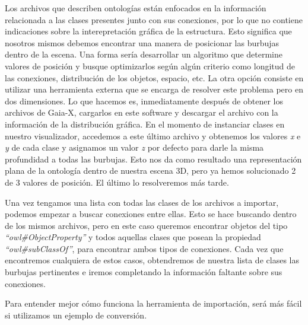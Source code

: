Los archivos que describen ontologías están enfocados en la información relacionada a las clases presentes junto con sus conexiones, por lo que no contiene indicaciones sobre la interepretación gráfica de la estructura. Esto significa que nosotros mismos debemos encontrar una manera de posicionar las burbujas dentro de la escena. Una forma sería desarrollar un algoritmo que determine valores de posición y busque optimizarlos según algún criterio como longitud de las conexiones, distribución de los objetos, espacio, etc. La otra opción consiste en utilizar una herramienta externa que se encarga de resolver este problema pero en dos dimensiones.
Lo que hacemos es, inmediatamente después de obtener los archivos de Gaia-X, cargarlos en este software y descargar el archivo con la información de la distribución gráfica. En el momento de instanciar clases en nuestro visualizador, accedemos a este último archivo y obtenemos los valores \textit{x} e \textit{y} de cada clase y asignamos un valor \textit{z} por defecto para darle la misma profundidad a todas las burbujas. Esto nos da como resultado una representación plana de la ontología dentro de nuestra escena 3D, pero ya hemos solucionado 2 de 3 valores de posición. El último lo resolveremos más tarde.



Una vez tengamos una lista con todas las clases de los archivos a importar, podemos empezar a buscar conexiones entre ellas. Esto se hace buscando dentro de los mismos archivos, pero en este caso queremos encontrar objetos del tipo \textit{``owl\#ObjectProperty''} y todos aquellas clases que posean la propiedad \textit{``owl\#subClassOf''}, para encontrar ambos tipos de conexiones. Cada vez que encontremos cualquiera de estos casos, obtendremos de nuestra lista de clases las burbujas pertinentes e iremos completando la información faltante sobre sus conexiones.

Para entender mejor cómo funciona la herramienta de importación, será más fácil si utilizamos un ejemplo de conversión.

